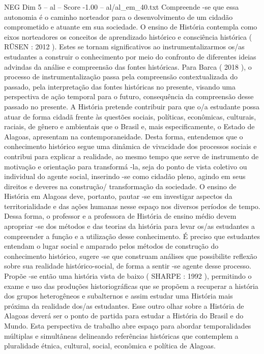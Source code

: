 \begin{textsample}{NEG Dim 5 – al – Score -1.00 – al/al\_em\_40.txt}
Compreende -se que essa autonomia é o caminho norteador para o desenvolvimento de um cidadão comprometido e atuante em sua sociedade.
O ensino de História contempla como eixos norteadores os conceitos de aprendizado histórico e consciência histórica ( RÜSEN : 2012 ).
Estes se tornam significativos ao instrumentalizarmos os/as estudantes a construir o conhecimento por meio do confronto de diferentes ideias advindas da análise e compreensão das fontes históricas.
Para Barca ( 2018 ), o processo de instrumentalização passa pela compreensão contextualizada do passado, pela interpretação das fontes históricas no presente, visando uma perspectiva de ação temporal para o futuro, consequência da compreensão desse passado no presente.
A História pretende contribuir para que o/a estudante possa atuar de forma cidadã frente às questões sociais, políticas, econômicas, culturais, raciais, de gênero e ambientais que o Brasil e, mais especificamente, o Estado de Alagoas, apresentam na contemporaneidade.
Desta forma, entendemos que o conhecimento histórico segue uma dinâmica de vivacidade dos processos sociais e contribui para explicar a realidade, ao mesmo tempo que serve de instrumento de motivação e orientação para transformá -la, seja do ponto de vista coletivo ou individual do agente social, inserindo -se como cidadão pleno, agindo em seus direitos e deveres na construção/ transformação da sociedade.
O ensino de História em Alagoas deve, portanto, pautar -se em investigar aspectos da territorialidade e das ações humanas nesse espaço nos diversos períodos de tempo.
Dessa forma, o professor e a professora de História de ensino médio devem apropriar -se dos métodos e das teorias da história para levar os/as estudantes a compreender a função e a utilização desse conhecimento.
É preciso que estudantes entendam o lugar social e amparado pelos métodos de construção do conhecimento histórico, sugere -se que construam análises que possibilite reflexão sobre sua realidade histórico-social, de forma a sentir -se agente desse processo.
Propõe -se então uma história vista de baixo ( SHARPE : 1992 ), permitindo o exame e uso das produções historiográficas que se propõem a recuperar a história dos grupos heterogêneos e subalternos e assim estudar uma História mais próxima da realidade dos/as estudantes.
Esse outro olhar sobre a História de Alagoas deverá ser o ponto de partida para estudar a História do Brasil e do Mundo.
Esta perspectiva de trabalho abre espaço para abordar temporalidades múltiplas e simultâneas delineando referências históricas que contemplem a pluralidade étnica, cultural, social, econômica e política de Alagoas.

\end{textsample}
